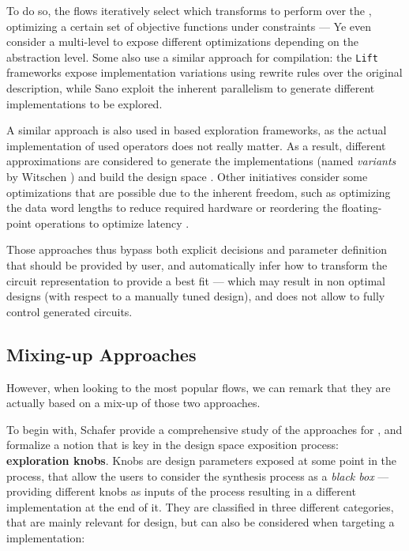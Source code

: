         To do so, the  flows iteratively select which transforms to perform over the , optimizing a certain set of objective functions under constraints \cite{prost-boucle_fast_2014} --- Ye \etal{} \cite{ye_scalehls_2021} even consider a multi-level  to expose different optimizations depending on the abstraction level.
        Some  also use a similar approach for compilation: the {\tt Lift} \cite{kristien_high-level_2019} frameworks expose implementation variations using rewrite rules over the original description, while Sano \etal{} \cite{sano_dsl-based_2015} exploit the inherent parallelism to generate different implementations to be explored.

        A similar approach is also used in  based exploration frameworks, as the actual implementation of used operators does not really matter.
        As a result, different approximations are considered to generate the implementations (named {\it variants} by Witschen \etal{} \cite{witschen_circa_2019}) and build the design space \cite{manuel_model-based_2020}\cite{barone_multi-objective_2021}.
        Other initiatives consider some optimizations that are possible due to the  inherent freedom, such as optimizing the data word lengths to reduce required hardware \cite{herve_data_2005} or reordering the floating-point operations to optimize latency \cite{gao_automatically_2016}.

        Those approaches thus bypass both explicit decisions and parameter definition that should be provided by user, and automatically infer how to transform the circuit representation to provide a best fit --- which may result in non optimal designs (with respect to a manually tuned design), and does not allow to fully control generated circuits.

    \subsection{Mixing-up Approaches}
    \label{ch.state:sec.space:ssec.mixing}
        However, when looking to the most popular  flows, we can remark that they are actually based on a mix-up of those two approaches.

        To begin with, Schafer \etal{} \cite{schafer_high-level_2020} provide a comprehensive study of the  approaches for , and formalize a notion that is key in the design space exposition process: {\bf exploration knobs}.
        Knobs are design parameters exposed at some point in the process, that allow the users to consider the synthesis process as a {\it black box} --- providing different knobs as inputs of the process resulting in a different  implementation at the end of it.
        They are classified in three different categories, that are mainly relevant for  design, but can also be considered when targeting a  implementation:


